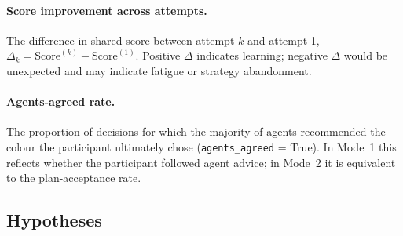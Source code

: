 \documentclass[11pt]{article}
\theoremstyle{definition}
\begin{document}
\paragraph{Score improvement across attempts.}
The difference in shared score between attempt $k$ and attempt 1, $\Delta_k =
\text{Score}^{(k)} - \text{Score}^{(1)}$.  Positive $\Delta$ indicates learning;
negative $\Delta$ would be unexpected and may indicate fatigue or strategy abandonment.

\paragraph{Agents-agreed rate.}
The proportion of decisions for which the majority of agents recommended the colour the
participant ultimately chose (\texttt{agents\_agreed} = True).  In Mode~1 this reflects
whether the participant followed agent advice; in Mode~2 it is equivalent to the
plan-acceptance rate.

\subsection{Hypotheses}
\end{document}
